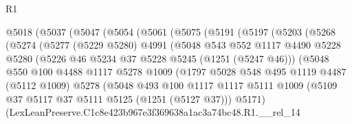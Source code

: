 \begin{lexlean}{R1}
\begin{coremodule}
                @5018
                  (@5037
                    (@5047
                      (@5054
                        (@5061
                          (@5075
                            (@5191
                              (@5197
                                (@5203
                                  (@5268
                                    (@5274
                                      (@5277
                                        (@5229 @5280)
                                        @4991
                                        (@5048
                                          @543
                                          @552
                                          @1117
                                          @4490
                                          @5228
                                          @5280
                                          (@5226 @46 @5234 @37 @5228 @5245 (@1251 (@5247 @46)))
                                          (@5048
                                            @550
                                            @100
                                            @4488
                                            @1117
                                            @5278
                                            @1009
                                            (@1797
                                              @5028
                                              @548
                                              @495
                                              @1119
                                              @4487
                                              (@5112 @1009)
                                              @5278
                                              (@5048
                                                @493
                                                @100
                                                @1117
                                                @1117
                                                @5111
                                                @1009
                                                (@5109
                                                  @37
                                                  @5117
                                                  @37
                                                  @5111
                                                  @5125
                                                  (@1251 (@5127 @37)))
                                                @5171)
                                              (LexLeanPreserve.C1c8e423b967e3f369638a1ac3a74bc48.R1.__rel_14

\end{coremodule}
\end{lexlean}
